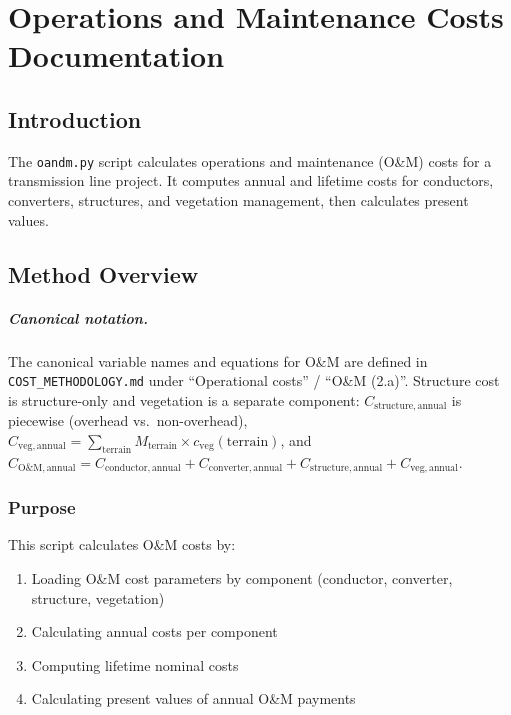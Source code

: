 \documentclass[ctcc_full_documentation.tex]{subfiles}
\begin{document}
\chapter{Operations and Maintenance Costs Documentation}

\section{Introduction}

The \texttt{oandm.py} script calculates operations and maintenance (O\&M) costs for a transmission line project. It computes annual and lifetime costs for conductors, converters, structures, and vegetation management, then calculates present values.

\section{Method Overview}

\paragraph{Canonical notation.}
The canonical variable names and equations for O\&M are defined in \texttt{COST\_METHODOLOGY.md} under ``Operational costs'' / ``O\&M (2.a)''. Structure cost is structure-only and vegetation is a separate component: $C_{\mathrm{structure,annual}}$ is piecewise (overhead vs.\ non-overhead), $C_{\mathrm{veg,annual}} = \sum_{\mathrm{terrain}} M_{\mathrm{terrain}} \times c_{\mathrm{veg}}(\mathrm{terrain})$, and $C_{\mathrm{O\&M,annual}} = C_{\mathrm{conductor,annual}} + C_{\mathrm{converter,annual}} + C_{\mathrm{structure,annual}} + C_{\mathrm{veg,annual}}$.

\subsection{Purpose}

This script calculates O\&M costs by:
\begin{enumerate}
    \item Loading O\&M cost parameters by component (conductor, converter, structure, vegetation)
    \item Calculating annual costs per component
    \item Computing lifetime nominal costs
    \item Calculating present values of annual O\&M payments
\end{enumerate}
\end{document}
